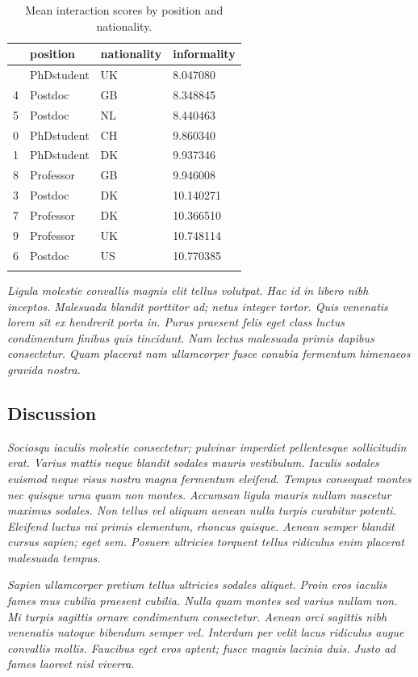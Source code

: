 \documentclass[
  a4paper,
]{scrbook}
\begin{document}
\begin{longtable}[]{@{}llll@{}}

\toprule\noalign{}
& position & nationality & informality \\
\midrule\noalign{}
\endhead
\bottomrule\noalign{}
\endlastfoot
2 & PhDstudent & UK & 8.047080 \\
4 & Postdoc & GB & 8.348845 \\
5 & Postdoc & NL & 8.440463 \\
0 & PhDstudent & CH & 9.860340 \\
1 & PhDstudent & DK & 9.937346 \\
8 & Professor & GB & 9.946008 \\
3 & Postdoc & DK & 10.140271 \\
7 & Professor & DK & 10.366510 \\
9 & Professor & UK & 10.748114 \\
6 & Postdoc & US & 10.770385 \\


\caption{\label{tbl-mean-informality}Mean interaction scores by position
and nationality.}

\tabularnewline
\end{longtable}

\emph{Ligula molestie convallis magnis elit tellus volutpat. Hac id in
libero nibh inceptos. Malesuada blandit porttitor ad; netus integer
tortor. Quis venenatis lorem sit ex hendrerit porta in. Purus praesent
felis eget class luctus condimentum finibus quis tincidunt. Nam lectus
malesuada primis dapibus consectetur. Quam placerat nam ullamcorper
fusce conubia fermentum himenaeos gravida nostra.}

\subsection{Discussion}\label{discussion}

\emph{Sociosqu iaculis molestie consectetur; pulvinar imperdiet
pellentesque sollicitudin erat. Varius mattis neque blandit sodales
mauris vestibulum. Iaculis sodales euismod neque risus nostra magna
fermentum eleifend. Tempus consequat montes nec quisque urna quam non
montes. Accumsan ligula mauris nullam nascetur maximus sodales. Non
tellus vel aliquam aenean nulla turpis curabitur potenti. Eleifend
luctus mi primis elementum, rhoncus quisque. Aenean semper blandit
cursus sapien; eget sem. Posuere ultricies torquent tellus ridiculus
enim placerat malesuada tempus.}

\emph{Sapien ullamcorper pretium tellus ultricies sodales aliquet. Proin
eros iaculis fames mus cubilia praesent cubilia. Nulla quam montes sed
varius nullam non. Mi turpis sagittis ornare condimentum consectetur.
Aenean orci sagittis nibh venenatis natoque bibendum semper vel.
Interdum per velit lacus ridiculus augue convallis mollis. Faucibus eget
eros aptent; fusce magnis lacinia duis. Justo ad fames laoreet nisl
viverra.}
\end{document}
